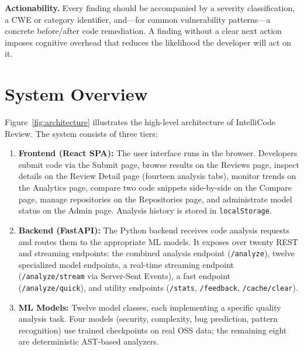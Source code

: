 \documentclass[12pt, oneside]{report}
\begin{document}
\textbf{Actionability.} Every finding should be accompanied by a severity classification,
a CWE or category identifier, and---for common vulnerability patterns---a concrete
before/after code remediation. A finding without a clear next action imposes cognitive
overhead that reduces the likelihood the developer will act on it.

\section{System Overview}
\label{sec:overview}

Figure~\ref{fig:architecture} illustrates the high-level architecture of IntelliCode Review.
The system consists of three tiers:

\begin{enumerate}
  \item \textbf{Frontend (React SPA):} The user interface runs in the browser. Developers
    submit code via the Submit page, browse results on the Reviews page, inspect details
    on the Review Detail page (fourteen analysis tabs), monitor trends on the Analytics
    page, compare two code snippets side-by-side on the Compare page, manage repositories
    on the Repositories page, and administrate model status on the Admin page. Analysis
    history is stored in \texttt{localStorage}.
  \item \textbf{Backend (FastAPI):} The Python backend receives code analysis requests
    and routes them to the appropriate ML models. It exposes over twenty REST and
    streaming endpoints: the combined analysis endpoint (\texttt{/analyze}), twelve
    specialized model endpoints, a real-time streaming endpoint
    (\texttt{/analyze/stream} via Server-Sent Events), a fast endpoint
    (\texttt{/analyze/quick}), and utility endpoints (\texttt{/stats},
    \texttt{/feedback}, \texttt{/cache/clear}).
  \item \textbf{ML Models:} Twelve model classes, each implementing a specific quality
    analysis task. Four models (security, complexity, bug prediction, pattern recognition)
    use trained checkpoints on real OSS data; the remaining eight are deterministic
    AST-based analyzers.
\end{enumerate}
\end{document}
